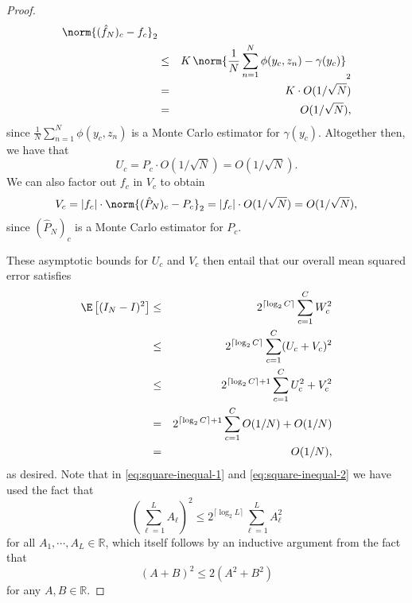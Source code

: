 \begin{proof}
\begin{eqnarray*}
		\norm{(\hat{f}_N)_c - f_c}_2 \\
		&\leq& K \, \norm{\frac{1}{N} \sum_{n=1}^N \phi(y_c, z_n) - \gamma(y_c)}_2 \\
		&=& K \cdot O(1/\sqrt{N}) \\
		&=& O(1/\sqrt{N}),
	\end{eqnarray*}
	since $\frac{1}{N} \sum_{n=1}^N \phi(y_c, z_n)$ is a Monte Carlo estimator for
	$\gamma(y_c)$. Altogether then, we have that
	\[
	U_c = P_c \cdot O(1 / \sqrt{N}) = O(1 / \sqrt{N}).
	\]
	We can also factor out $f_c$ in $V_c$ to obtain
	\[
	V_c = |f_c| \cdot \norm{(\hat{P}_N)_c - P_c}_2 = |f_c| \cdot O(1/\sqrt{N}) = O(1/\sqrt{N}),
	\]
	since $(\hat{P}_N)_c$ is a Monte Carlo estimator for $P_c$.
	
	These asymptotic bounds for $U_c$ and $V_c$ then entail that our overall mean squared
	error satisfies
	\begin{eqnarray}
	\E\left[(I_N - I)^2\right] &\leq& 2^{\lceil \log_2 C \rceil} \sum_{c=1}^C W_c^2 \label{eq:square-inequal-1} \\
	&\leq& 2^{\lceil \log_2 C \rceil} \sum_{c=1}^C (U_c + V_c)^2 \notag \\
	&\leq& 2^{\lceil \log_2 C \rceil + 1} \sum_{c=1}^C U_c^2 + V_c^2 \label{eq:square-inequal-2} \\
	&=& 2^{\lceil \log_2 C \rceil + 1} \sum_{c=1}^C O(1/N) + O(1/N) \notag \\
	&=& O(1/N), \notag
	\end{eqnarray}
	as desired. Note that in \eqref{eq:square-inequal-1} and
	\eqref{eq:square-inequal-2} we have used the fact that
	\[
	\left(\sum_{\ell=1}^L A_\ell\right)^2 \leq 2^{\lceil \log_2 L \rceil} \sum_{\ell=1}^L A_\ell^2
	\]
  for all $A_1, \cdots, A_L \in \mathbb{R}$, which itself follows by an inductive argument
  from the fact that
	\[
    (A+B)^2 \le 2(A^2+B^2)
	\]	
	for any $A, B \in \mathbb{R}$.
\end{proof}

